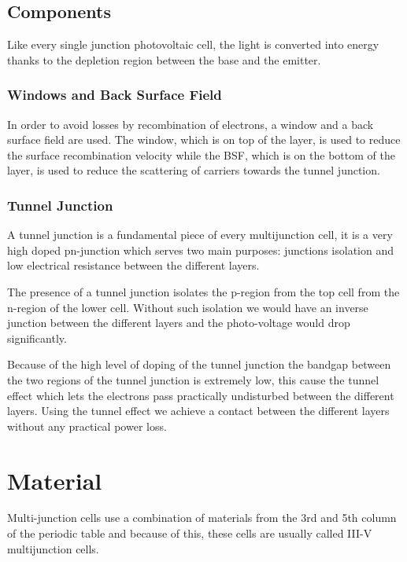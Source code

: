 \documentclass[11pt]{article} %
\begin{document}
\subsection{Components}  

Like every single junction photovoltaic cell, the light is converted into energy thanks to the depletion region between the base and the emitter.  

\subsubsection{Windows and Back Surface Field}  
In order to avoid losses by recombination of electrons, a window and a back surface field are used.  The window, which is on top of the layer, is used to reduce the surface recombination velocity while the BSF, which is on the bottom of the layer, is used to reduce the scattering of carriers towards the tunnel junction.  

\subsubsection{Tunnel Junction}

A tunnel junction is a fundamental piece of every multijunction cell, it is a very high doped pn-junction which serves two main purposes: junctions isolation and low electrical resistance between the different layers.  

The presence of a tunnel junction isolates the p-region from the top cell from the n-region of the lower cell.  Without such isolation we would have an inverse junction between the different layers and the photo-voltage would drop significantly.  

Because of the high level of doping of the tunnel junction the bandgap between the two regions of the tunnel junction is extremely low, this cause the tunnel effect which lets the electrons pass practically undisturbed between the different layers.  Using the tunnel effect we achieve a contact between the different layers without any practical power loss.


\section{Material}

Multi-junction cells use a combination of materials from the 3rd  and 5th column of the periodic table and because of this, these cells are usually called III-V multijunction cells.
\end{document}
